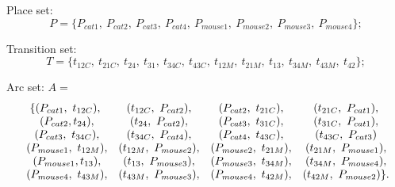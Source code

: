 \documentclass[11pt]{article}
\begin{document}
\begin{flushleft}
	Place set:$$P=\{P_{cat1},\ P_{cat2},\ P_{cat3},\ P_{cat4},\ P_{mouse1},\ P_{mouse2},\ P_{mouse3},\ P_{mouse4}\};$$
	
	Transition set:$$T=\{t_{12C},\ t_{21C},\ t_{24},\ t_{31},\  t_{34C},\ t_{43C},\ t_{12M},\ t_{21M},\ t_{13},\ t_{34M},\  t_{43M},\ t_{42}\};$$
	
	Arc set: $A=$
	\begin{equation*}
	\begin{array}{*{4}c}
	\{(P_{cat1},\ t_{12C}), & (t_{12C},\ P_{cat2}), & (P_{cat2},\ t_{21C}), & (t_{21C},\ P_{cat1}),\\
	\ (P_{cat2}, t_{24}), & (t_{24},\ P_{cat2}), & (P_{cat3},\ t_{31C}), & (t_{31C},\ P_{cat1}),\\
	\ (P_{cat3},\ t_{34C}), & (t_{34C},\ P_{cat4}), & (P_{cat4},\ t_{43C}), & (t_{43C},\ P_{cat3})\\
	\ (P_{mouse1},\ t_{12M}), & (t_{12M},\ P_{mouse2}), & (P_{mouse2},\ t_{21M}), & (t_{21M},\ P_{mouse1}),\\
	\ (P_{mouse1}, t_{13}), & (t_{13},\ P_{mouse3}), & (P_{mouse3},\ t_{34M}), & (t_{34M},\ P_{mouse4}),\\
	\ (P_{mouse4},\ t_{43M}), & (t_{43M},\ P_{mouse3}), & (P_{mouse4},\ t_{42M}), & (t_{42M},\ P_{mouse2})\}.
	\end{array}
	\end{equation*}	
%	
%
%
%

\end{flushleft}
\end{document}
